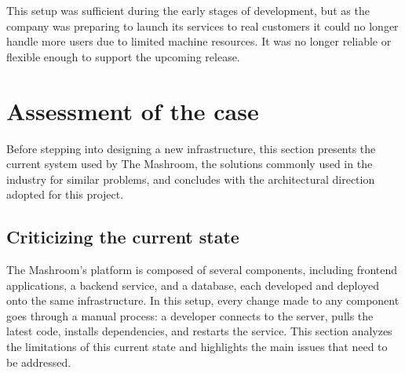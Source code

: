 This setup was sufficient during the early stages of development, but as the company was preparing to launch its services to real customers it could no longer handle more users due to limited machine resources. It was no longer reliable or flexible enough to support the upcoming release.
\section{Assessment of the case}
Before stepping into designing a new infrastructure, this section presents the current 
system used by The Mashroom, the solutions commonly used in the industry for similar problems,
and concludes with the architectural direction adopted for this project.

\subsection{Criticizing the current state}
The Mashroom's platform is composed of several components, including frontend applications, 
a backend service, and a database, each developed and deployed onto the same infrastructure. 
In this setup, every change made to any component goes through a manual process: a developer 
connects to the server, pulls the latest code, installs dependencies, and restarts the service. 
This section analyzes the limitations of this current state and highlights the main issues 
that need to be addressed.
